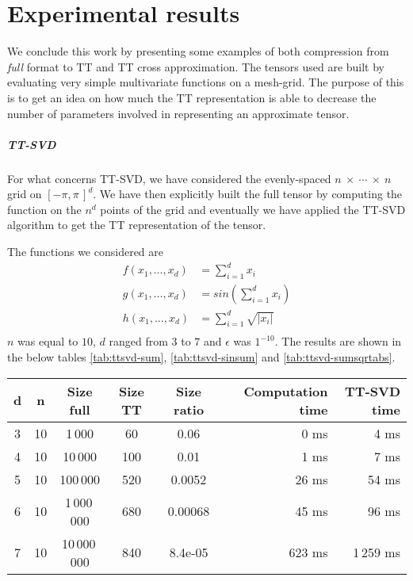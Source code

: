 \chapter{Experimental results}
We conclude this work by presenting some examples of both compression from \emph{full} format to TT and TT cross approximation. The tensors used are built by evaluating very simple multivariate functions on a mesh-grid. The purpose of this is to get an idea on how much the TT representation is able to decrease the number of parameters involved in representing an approximate tensor.

\paragraph{TT-SVD}
For what concerns TT-SVD, we have considered the evenly-spaced $n~\times~\cdots~\times~n$ grid on $[-\pi,\pi\,]^d$. We have then explicitly built the full tensor by computing the function on the $n^d$ points of the grid and eventually we have applied the TT-SVD algorithm to get the TT representation of the tensor.

The functions we considered are
\begin{align*}
  f(x_1,\ldots,x_d) &= \sum_{i=1}^{d} x_i\\
  g(x_1,\ldots,x_d) &= sin(\sum_{i=1}^{d} x_i)\\
  h(x_1,\ldots,x_d) &= \sum_{i=1}^{d} \sqrt{|x_i|}\\
\end{align*}
$n$ was equal to $10$, $d$ ranged from $3$ to $7$ and $\epsilon$ was $1^{-10}$.
The results are shown in the below tables \ref{tab:ttsvd-sum}, \ref{tab:ttsvd-sinsum} and \ref{tab:ttsvd-sumsqrtabs}.

\begin{center}
  \begin{tabular}[t]{cccccrr}
    \toprule
    d & n  & Size full & Size TT & Size ratio & Computation time & TT-SVD time\\ \midrule
    3 & 10 & 1\,000     & 60     & 0.06      & 0 ms & 4 ms\\
    4 & 10 & 10\,000    & 100    & 0.01      & 1 ms & 7 ms\\
    5 & 10 & 100\,000   & 520    & 0.0052    & 26 ms & 54 ms\\
    6 & 10 & 1\,000\,000  & 680    & 0.00068   & 45 ms & 96 ms\\ 
    7 & 10 & 10\,000\,000 &840&8.4e-05& 623 ms & 1\,259 ms\\ \bottomrule
  \end{tabular}
\end{center}

